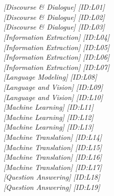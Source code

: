 \section[Poster Session A]{}
\bigskip{}
\par
{}\par
\bigskip{}
\hfill \textit{[Discourse \& Dialogue]  [ID:L01]} \\ 
\hfill \textit{[Discourse \& Dialogue]  [ID:L02]} \\ 
\hfill \textit{[Discourse \& Dialogue]  [ID:L03]} \\ 
\hfill \textit{[Information Extraction]  [ID:L04]} \\ 
\hfill \textit{[Information Extraction]  [ID:L05]} \\ 
\hfill \textit{[Information Extraction]  [ID:L06]} \\ 
\hfill \textit{[Information Extraction]  [ID:L07]} \\ 
\hfill \textit{[Language Modeling]  [ID:L08]} \\ 
\hfill \textit{[Language and Vision]  [ID:L09]} \\ 
\hfill \textit{[Language and Vision]  [ID:L10]} \\ 
\hfill \textit{[Machine Learning]  [ID:L11]} \\ 
\hfill \textit{[Machine Learning]  [ID:L12]} \\ 
\hfill \textit{[Machine Learning]  [ID:L13]} \\ 
\hfill \textit{[Machine Translation]  [ID:L14]} \\ 
\hfill \textit{[Machine Translation]  [ID:L15]} \\ 
\hfill \textit{[Machine Translation]  [ID:L16]} \\ 
\hfill \textit{[Machine Translation]  [ID:L17]} \\ 
\hfill \textit{[Question Answering]  [ID:L18]} \\ 
\hfill \textit{[Question Answering]  [ID:L19]} \\ 
